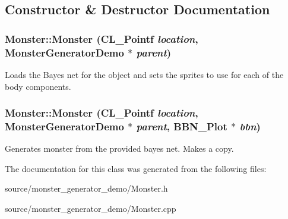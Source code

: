 \subsection{Constructor \& Destructor Documentation}
\hypertarget{classMonster_af4dbf8422477e5d7a8c8639ed8a6e7a7}{
\subsubsection[{Monster}]{\setlength{\rightskip}{0pt plus 5cm}Monster::Monster (CL\_\-Pointf {\em location}, \/  {\bf MonsterGeneratorDemo} $\ast$ {\em parent})}}
\label{classMonster_af4dbf8422477e5d7a8c8639ed8a6e7a7}
Loads the Bayes net for the object and sets the sprites to use for each of the body components. \hypertarget{classMonster_a1b3329ad00743bd5432d81ee487ca7ae}{
\subsubsection[{Monster}]{\setlength{\rightskip}{0pt plus 5cm}Monster::Monster (CL\_\-Pointf {\em location}, \/  {\bf MonsterGeneratorDemo} $\ast$ {\em parent}, \/  {\bf BBN\_\-Plot} $\ast$ {\em bbn})}}
\label{classMonster_a1b3329ad00743bd5432d81ee487ca7ae}
Generates monster from the provided bayes net. Makes a copy. 

The documentation for this class was generated from the following files:\begin{DoxyCompactItemize}
\item 
source/monster\_\-generator\_\-demo/Monster.h\item 
source/monster\_\-generator\_\-demo/Monster.cpp\end{DoxyCompactItemize}
